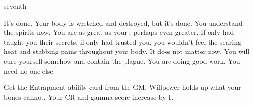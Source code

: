 \documentclass[greennotebook]{Pestilence} %
\begin{document}
\begin{page}{seventh}

It's done. Your body is wretched and destroyed, but it's done. You understand the spirits now. You are as great as your \cElder{\parent}, perhaps even greater. If only \cElder{\they} had taught you their secrets, if only \cElder{\they} had trusted you, you wouldn't feel the searing heat and stabbing pains throughout your body. It does not matter now. You will cure yourself somehow and contain the plague. You are doing good work. You need no one else. 

Get the Entrapment ability card from the GM. Willpower holds up what your bones cannot. Your CR and gamma score increase by 1.

\end{page}

\endnotebook
\end{document}
